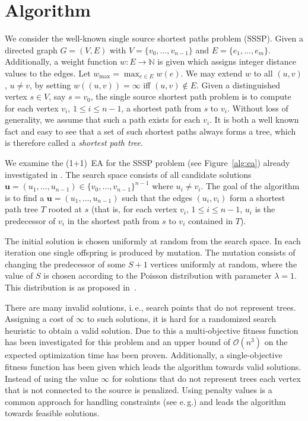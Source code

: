 \documentclass{sig-alternate}
\newcommand{\ie}{i.\,e.\xspace}
\newcommand{\Wlog}{W.\,l.\,o.\,g.\xspace}
\renewcommand{\Wlog}{Without loss of generality\xspace}
\newcommand{\eg}{e.\,g.\xspace}
\newcommand{\N}{{\mathbb{N}}}
\newcommand{\oneoneea}{(1+1)~EA\xspace}
\newcommand{\Oh}{\ensuremath{\mathcal{O}}}
\begin{document}


\section{Algorithm}
\label{sec:algo}

We consider the well-known single source shortest paths problem
(SSSP).  Given a directed graph $G=(V,E)$ with $V= \{v_0, \ldots,
v_{n-1}\}$ and $E = \{e_1, \ldots, e_m\}$. Additionally, a weight
function $w\colon E \rightarrow \N$ is given which assigns integer
distance values to the edges.  Let $w_{\max} = \max_{e \in E} w(e)$.
We may extend $w$ to all $(u,v)$, $u \not = v$, by setting $w((u,v)) = \infty$ iff
$(u,v) \notin E$. Given a distinguished vertex $s \in V$, say $s = v_0$, the 
single source shortest path problem is to compute for  each vertex $v_i$,
$1\leq i \leq n-1$, a shortest path from $s$ to $v_i$. \Wlog,
we assume that such a path exists for each $v_i$. It is both a well known fact 
and easy to see that a set of such shortest paths always forms a tree,
which is therefore called a \emph{shortest path tree}. 

We examine the \oneoneea for the SSSP problem (see
Figure~\ref{alg:ea}) already investigated in \cite{spea04}.  The
search space consists of all candidate solutions $\mathbf{u} = (u_1,
\ldots, u_{n-1}) \in \{v_0, \ldots, v_{n-1}\}^{n-1}$ where $u_i \neq v_i$.
The goal of the algorithm is to find a $\mathbf{u} =
(u_1,\ldots,u_{n-1})$ such that the edges $(u_i, v_i)$ form a shortest path tree $T$
rooted at $s$ (that is, for each vertex $v_i$, $1 \leq i \leq n -1$, $u_i$ is
the predecessor of $v_i$ in the shortest path from $s$ to $v_i$ contained in $T$). 

The initial solution is chosen
uniformly at random from the search space.  In each iteration one
single offspring is produced by mutation. The mutation consists of
changing the predecessor of some $S+1$ vertices uniformly at random,
where the value of $S$ is chosen according to the Poisson distribution with
parameter $\lambda=1$. This distribution is as proposed in~\cite{spea04}.

 
There are many 
invalid solutions, \ie, search points that do not represent trees.
Assigning a cost of $\infty$ to such solutions, it is   
hard for a randomized search heuristic to obtain a valid solution. Due to this a 
multi-objective fitness function has been investigated for this problem and
an upper bound of $\Oh(n^3)$ on the expected optimization time has been proven. 
Additionally, a single-objective fitness function has been given
which leads the algorithm towards valid solutions. 
Instead of using the value $\infty$ for solutions that do not
represent trees each vertex that is not connected to the source is penalized. Using penalty values 
is a common approach for handling constraints (see \eg \cite{Michalewicz95}) and 
leads the algorithm towards feasible solutions. 
\end{document}
